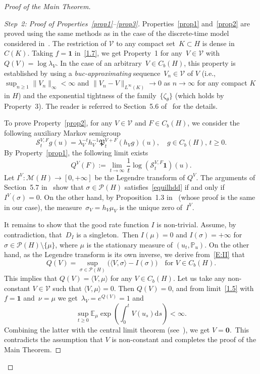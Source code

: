 \documentclass[10pt]{amsart}
\theoremstyle{definition}\newtheorem{defi}[theo]{Definition}\newtheorem{rema}[theo]{Remark}\newtheorem{exam}[theo]{Example}\newtheorem{exem}[theo]{Example}\newtheorem{nota}[theo]{Notation}
\newcommand{\mek}{{\mathbf 1}}
\newcommand{\IP}{{\mathbb P}}
\newcommand{\E}{{\mathbb E}}
\newcommand{\MM}{{\mathcal M}}
\newcommand{\PP}{{\mathcal P}}
\newcommand{\VV}{{\mathcal V}}
\newcommand{\la}{\lambda}
\newcommand{\ty}{\infty}
\newcommand{\PPPP}{{\mathfrak P}}
\newcommand{\SSS}{{\mathscr S}}
\newcommand{\lag}{\langle}
\newcommand{\rag}{\rangle}
\newcommand{\dd}{\mathrm{d}}
\newenvironment{proofc}[1][\proofname]{\begin{proof}[{#1}]}{\end{proof}}
\begin{document}
\begin{proofc}[Proof of the Main Theorem]
\begin{proof}[Step~2: Proof of Properties~\eqref{prop1}--\eqref{prop3}]
Properties~\eqref{prop1} and~\eqref{prop2} are proved using the same methods as in the case of the discrete-time model considered in~\cite{JNPS-2014}. The restriction of $\VV$ to any compact set~$K\subset H$ is dense in $C(K)$. Taking $f=\mek $ in~\eqref{1.7}, we get Property~1 for any~$V\in \VV$ with~$Q(V)=\log \la_V$. In the case of an arbitrary~$V\in C_b(H)$, this property is established by using a \emph{buc-approximating} sequence~$V_n\in\VV$ of $V$ (i.e.,~$\sup_{n\ge1}\|V_n\|_\ty \!< \!\ty$ and $\|V_n-V\|_{L^\ty(K)}\to 0$ as $ n\to\ty$ for any compact $K$ in $ H$) and the exponential tightness of the family~$\{\zeta_\theta\}$ (which holds by Property~3). The reader is referred to Section~5.6 of~\cite{JNPS-2014} for the details.

To prove Property~\eqref{prop2}, for any $V\in \VV$ and $F\in C_b(H)$, we consider the following auxiliary Markov semigroup
\[
\SSS_t^{V,F}g (u)=\lambda_V^{-t}h_V^{-1}\PPPP_t^{V+F}(h_V g)(u), \quad g\in C_b(H), \, t\ge0.
\]
By Property~\eqref{prop1}, the following limit exists
\[
Q^V(F):=\lim_{t\to\ty} \frac{1}{t}\log(\SSS_t^{V,F}{\mek})(u).
\]
Let $I^V: \MM(H)\to [0,+\infty] $ be the Legendre transform of $Q^V$.
The arguments of Section~5.7 in~\cite{JNPS-2014} show that $\sigma\in \PP(H)$ satisfies~\eqref{equilhdd} if and only if $I^V(\sigma)=0$. On the other hand, by Proposition~1.3 in~\cite{MN-2015} (whose proof is the same in our case), the measure~$\sigma_V=h_V\mu_V$ is the unique zero of~$I^V$.


It remains to show that the good rate function $I$ is non-trivial. Assume, by contradiction, that~$D_I$ is a singleton.~Then $I(\mu)=0$ and $I(\sigma)=+\ty$ for $\sigma\in\PP(H)\setminus\{\mu\}$, where $\mu$ is the stationary measure of $(u_t,\IP_u)$. On the other hand, as the Legendre transform is its own inverse, we derive from~\eqref{E:II} that
\[
Q(V)= \sup_{\sigma\in\PP(H)} \bigl(\lag V, \sigma\rag-I(\sigma)\bigr) \quad \text{for $V\in C_b(H)$}.
\]
This implies that $Q(V)=\lag V,\mu\rag$ for any $V\in C_b(H)$. Let us take any non-constant $V\in \VV$ such that $\lag V,\mu\rag=0$. Then $Q(V)=0$, and from limit~\eqref{1.5} with $f={\mathbf1}$ and~$\nu=\mu$ we get~$\la_V=e^{Q(V)}=1$ and
\begin{equation}\label{e52}
\sup_{t\ge0}\E_\mu \exp\left(\int_0^t V(u_s)\dd s\right)<\infty.
\end{equation}
Combining the latter with the central limit theorem (see~\cite[Proposition~4.1.4]{KS-book}), we get $V= {\mathbf0}$.~This contradicts the assumption that $V$ is non-constant and completes the proof of the Main Theorem.
\end{proof}
\let\qed\relax
\end{proofc}
\end{document}
